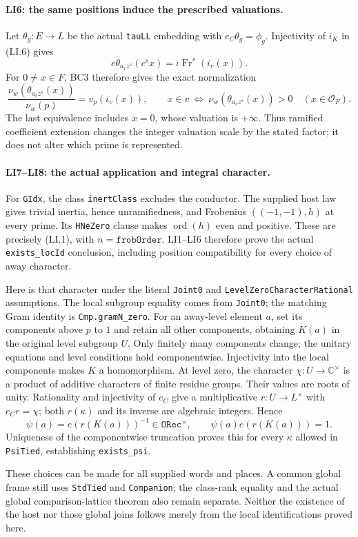 \paragraph{LI6: the same positions induce the prescribed valuations.}
Let $\theta_g:E\to L$ be the actual \texttt{tauLL} embedding with
$e_C\theta_g=\phi_g$. Injectivity of $i_K$ in (LI.6) gives
\[
 e\theta_{a_vz^s}(c^sx)=\iota\operatorname{Fr}^s(i_v(x)).
                                                               \tag{LI.9}
\]
For $0\ne x\in F$, BC3 therefore gives the exact normalization
\[
 \frac{\nu_w(\theta_{a_vz^s}(x))}{\nu_w(p)}=v_p(i_v(x)),
 \qquad
 x\in v\ \Longleftrightarrow\
 \nu_w(\theta_{a_vz^s}(x))>0\quad(x\in\mathcal O_F).
                                                               \tag{LI.10}
\]
The last equivalence includes $x=0$, whose valuation is $+\infty$.
Thus ramified coefficient extension changes the integer valuation scale
by the stated factor; it does not alter which prime is represented.

\paragraph{LI7--LI8: the actual application and integral character.}
For \texttt{GIdx}, the class \texttt{inertClass} excludes the conductor.
The supplied host law gives trivial inertia, hence unramifiedness, and
Frobenius $((-1,-1),h)$ at every prime. Its \texttt{HNeZero} clause
makes $\operatorname{ord}(h)$ even and positive. These are precisely
(LI.1), with $n=\texttt{frobOrder}$. LI1--LI6 therefore prove the actual
\texttt{exists\_locId} conclusion, including position compatibility
for every choice of away character.

Here is that character under the literal \texttt{Joint0} and
\texttt{LevelZeroCharacterRational} assumptions. The local subgroup
equality comes from \texttt{Joint0}; the matching Gram identity is
\texttt{Cmp.gramN\_zero}. For an away-level
element $a$, set its components above $p$ to $1$ and retain all other
components, obtaining $K(a)$ in the original level subgroup $U$.
Only finitely many components change; the unitary equations and level
conditions hold componentwise. Injectivity into the local components
makes $K$ a homomorphism. At level zero, the character
$\chi:U\to\mathbb C^\times$ is a product of additive characters of
finite residue groups. Their values are roots of unity. Rationality
and injectivity of $e_C$ give a multiplicative $r:U\to L^\times$
with $e_Cr=\chi$; both $r(\kappa)$ and its inverse are algebraic
integers. Hence
\[
 \psi(a)=e(r(K(a)))^{-1}\in\texttt{ORec}^{\times},
 \qquad \psi(a)e(r(K(a)))=1.                            \tag{LI.11}
\]
Uniqueness of the componentwise truncation proves this for every
$\kappa$ allowed in \texttt{PsiTied}, establishing \texttt{exists\_psi}.

These choices can be made for all supplied words and places. A common
global frame still uses \texttt{StdTied} and \texttt{Companion}; the
class-rank equality and the actual global comparison-lattice theorem
also remain separate. Neither the existence of the host nor those
global joins follows merely from the local identifications proved here.
